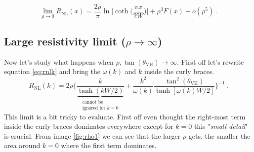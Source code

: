 \begin{equation}
    \lim_{\rho\to 0} R_{\textrm{NL}}(x)=
    \frac{2\rho}\pi\ln\bigg |\coth \Big(\frac{\pi x}{2W}\Big)\bigg | +
    \rho^3F(x) +
    o(\rho^5)\,.
    \label{eq:lowrho}
\end{equation}




















\subsection{Large resistivity limit ($\rho\to \infty$)}
\label{sec:highrho}
Now let's study what happens when $\rho,\tan(\theta_{\textrm{VH}})\to \infty$. First off let's rewrite equation \ref{eq:rnlk} and bring the $\omega(k)$ and $k$ inside the curly braces.
\begin{equation}
        R_{\textrm{NL}}(k)=2\rho
    \bigg\{
        \underbrace{\frac{k}{\tanh(kW/2)}}_{\substack{\text{cannot be}\\\text{ignored for } k=0}} + \frac {k^2}{\omega(k)}\frac{\tan^2(\theta_{\textrm{VH}})}{\tanh[\omega(k)W/2]}    
    \bigg\}^{-1}\,.
    \label{eq:rhoinf1}
\end{equation}
This limit is a bit tricky to evaluate. First off even thought the right-most term inside the curly braces dominates everywhere except for $k=0$ this "\emph{small detail}" is crucial. From image \ref{fig:rho1} we can see that the larger $\rho$ gets, the smaller the area around $k=0$ where the first term dominates.
